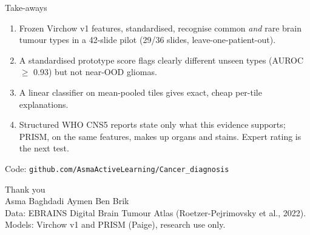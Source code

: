 \documentclass[aspectratio=169,11pt]{beamer}
\begin{document}
\begin{frame}{Take-aways}
  \begin{enumerate}
    \item Frozen Virchow v1 features, standardised, recognise common \emph{and} rare brain tumour types in a 42-slide pilot (29/36 slides, leave-one-patient-out).
    \item A standardised prototype score flags clearly different unseen types (AUROC $\ge$ 0.93) but not near-OOD gliomas.
    \item A linear classifier on mean-pooled tiles gives exact, cheap per-tile explanations.
    \item Structured WHO CNS5 reports state only what this evidence supports; PRISM, on the same features, makes up organs and stains. Expert rating is the next test.
  \end{enumerate}
  \vspace{1em}
  \centering
  {\color{muted}Code: \texttt{github.com/AsmaActiveLearning/Cancer\_diagnosis}}
\end{frame}

\begin{frame}[plain]
  \centering
  \vfill
  {\Huge\color{accent} Thank you}\\[1em]
  Asma Baghdadi \quad Aymen Ben Brik\\[0.5em]
  {\color{muted}\small Data: EBRAINS Digital Brain Tumour Atlas (Roetzer-Pejrimovsky et al., 2022).\\
  Models: Virchow v1 and PRISM (Paige), research use only.}
  \vfill
\end{frame}
\end{document}
